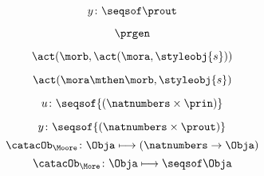 {\begin{forslides}
        
        
        \begin{equation}
            \label{eq:prgen-y-2}
            y\colon \seqsof  \prout
        \end{equation}
        
        \begin{equation}
            \label{eq:prgen}
            \prgen
        \end{equation}
        
        \begin{equation}
            \label{eq:now1}
            \act(\morb, \act(\mora, \styleobj{s}))
        \end{equation}
        
        
        \begin{equation}
            \label{eq:now2}
            \act(\mora\mthen\morb, \styleobj{s})
        \end{equation}
        
        \begin{equation}
            \label{eq:ev-sign}
            u\colon \seqsof{(\natnumbers \times \prin)}
        \end{equation}
        
        \begin{equation}
            \label{eq:ev-sign2}
            y\colon \seqsof{(\natnumbers \times \prout)}
        \end{equation}
        \begin{equation}
            \label{eq:phi-moore}
            {\catacOb_{\Moore}}\colon{\Obja}\longmapsto{(\natnumbers \to \Obja)}
        \end{equation}
        \begin{equation}
            \label{eq:phi-more}
            {\catacOb_{\More}}\colon{\Obja}\longmapsto{\seqsof \Obja}
        \end{equation}
    \end{forslides}
}
